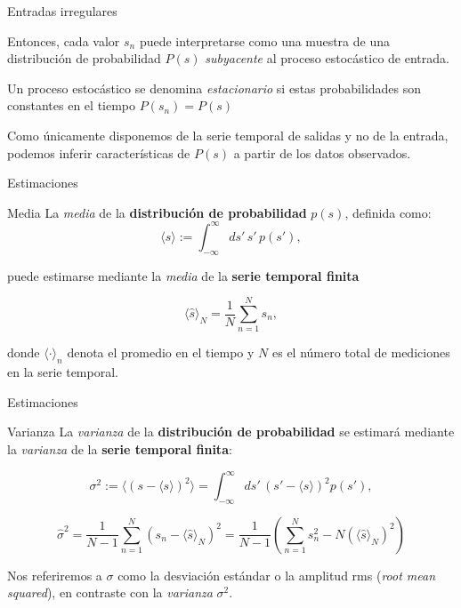 \documentclass[11pt]{beamer}
\begin{document}
\begin{frame}{Entradas irregulares}
	\begin{block}{}
		Entonces, cada valor $s_n$ puede interpretarse como una muestra de una distribución de probabilidad $P(s)$ \textit{subyacente} al proceso estocástico de entrada.
	\end{block}
	
	\begin{block}{}
		Un proceso estocástico se denomina \textit{estacionario} si estas probabilidades son constantes en el tiempo $P(s_n) = P(s)$
	\end{block}
	
	\begin{block}{}
		Como únicamente disponemos de la serie temporal de salidas y no de la entrada, podemos inferir características de $P(s)$ a partir de los datos observados.
	\end{block}
\end{frame}

\begin{frame}{Estimaciones}	
\begin{block}{Media}
	La \textit{media} de la \textbf{distribución de probabilidad} $p(s)$, definida como:
	\begin{equation}
		\langle s \rangle := \int_{-\infty}^{\infty} ds' \, s' \, p(s'), 
	\end{equation}

	puede estimarse mediante la \textit{media} de la \textbf{serie temporal finita}

	\begin{equation}
		\langle \hat{s} \rangle_N = \frac{1}{N} \sum_{n=1}^N s_n ,
	\end{equation}

	donde $\langle \cdot \rangle_n$ denota el promedio en el tiempo y $N$ es el número total de mediciones en la serie temporal. 
\end{block}

\end{frame}

\begin{frame}{Estimaciones}
\begin{block}{Varianza}
	La \emph{varianza} de la \textbf{distribución de probabilidad} se estimará mediante la \textit{varianza} de la \textbf{serie temporal finita}:

	\begin{equation}
		\sigma^2 := \langle (s - \langle s \rangle)^2 \rangle = \int_{-\infty}^{\infty} ds' \, (s' - \langle s \rangle)^2 p(s'),
	\end{equation}

	\begin{equation}
		\hat{\sigma}^2 = \frac{1}{N-1} \sum_{n=1}^N (s_n - \langle \hat{s} \rangle_N)^2 
= \frac{1}{N-1} \left( \sum_{n=1}^N s_n^2 - N (\langle \hat{s} \rangle_N)^2 \right)
	\end{equation}

	Nos referiremos a $\sigma$ como la desviación estándar o la amplitud rms (\emph{root mean squared}), en contraste con la \emph{varianza} $\sigma^2$.
\end{block}

\end{frame}
\end{document}
